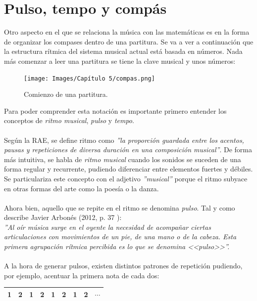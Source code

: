 \documentclass[a4paper, openright, 11pt, titlepage]{report}
\theoremstyle{definition}\newtheorem{defin}[propo]{Definition}
\theoremstyle{definition}\newtheorem{obser}[propo]{Remark}
\theoremstyle{definition}\newtheorem{ejem}[propo]{Ejemplo}
\theoremstyle{definition}\newtheorem{algoritmo}[propo]{Algoritmo}
\begin{document}
\chapter{Pulso, tempo y compás}
Otro aspecto en el que se relaciona la música con las matemáticas es en la forma de organizar los compases dentro de una partitura. Se va a ver a continuación que la estructura rítmica del sistema musical actual está basada en números. Nada más comenzar a leer una partitura se tiene la clave musical y unos números:
\begin{figure}[H]
    \centering
    \texttt{[image: Images/Capítulo 5/compas.png]}
    \caption{Comienzo de una partitura.}
\end{figure}
Para poder comprender esta notación es importante primero entender los conceptos de \textit{ritmo musical}, \textit{pulso} y \textit{tempo}.\\\\
Según la RAE, se define ritmo como \textit{''la proporción guardada entre los acentos, pausas y repeticiones de diversa duración en una composición musical''}. De forma más intuitiva, se habla de \textit{ritmo musical} cuando los sonidos se suceden de una forma regular y recurrente, pudiendo diferenciar entre elementos fuertes y débiles.\\
Se particulariza este concepto con el adjetivo \textit{''musical''} porque el ritmo subyace en otras formas del arte como la poesía o la danza.\\\\
Ahora bien, aquello que se repite en el ritmo se denomina \textit{pulso}. Tal y como describe Javier Arbonés (2012, p. 37 \cite{libro}):\\
\textit{''Al oír música surge en el oyente la necesidad de acompañar ciertas articulaciones con movimientos de un pie, de una mano o de la cabeza. Esta primera agrupación rítmica percibida es lo que se denomina <<pulso>>''.}\\\\
A la hora de generar pulsos, existen distintos patrones de repetición pudiendo, por ejemplo, acentuar la primera nota de cada dos:
\begin{table}[H]
    \centering
    \begin{tabular}{|c|c|c|c|c|c|c|c|c|}
    \hline
        \cellcolor{acento}1 & 2 & \cellcolor{acento}1 & 2 & \cellcolor{acento}1 & 2 & \cellcolor{acento}1 & 2 & $\cdots$ \\
    \hline
    \end{tabular}
\end{table}
\end{document}
